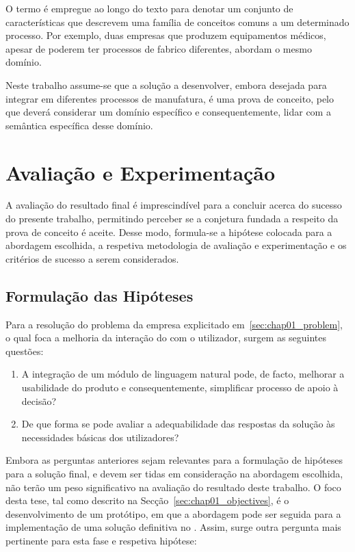 O termo  é empregue ao longo do texto para denotar um conjunto de características que descrevem uma família de conceitos comuns a um determinado processo. Por exemplo, duas empresas que produzem equipamentos médicos, apesar de poderem ter processos de fabrico diferentes, abordam o mesmo domínio.

Neste trabalho assume-se que a solução a desenvolver, embora desejada para integrar em diferentes processos de manufatura, é uma prova de conceito, pelo que deverá considerar um domínio específico e consequentemente, lidar com a semântica específica desse domínio.

\section{Avaliação e Experimentação}
\label{sec:chap01_solutionevaluation}
A avaliação do resultado final é imprescindível para a concluir acerca do sucesso do presente trabalho, permitindo perceber se a conjetura fundada a respeito da prova de conceito é aceite. Desse modo, formula-se a hipótese colocada para a abordagem escolhida, a respetiva metodologia de avaliação e experimentação e os critérios de sucesso a serem considerados.

\subsection{Formulação das Hipóteses}
\label{sec:chap01_hypothesis}
Para a resolução do problema da empresa explicitado em~\ref{sec:chap01_problem}, o qual foca a melhoria da interação do {\productname} com o utilizador, surgem as seguintes questões:

\begin{enumerate}
    \item
    {
        A integração de um módulo de linguagem natural pode, de facto, melhorar a usabilidade do produto e consequentemente, simplificar processo de apoio à decisão?
    }
    \item
    {
        De que forma se pode avaliar a adequabilidade das respostas da solução às necessidades básicas dos utilizadores?
    }
\end{enumerate}

Embora as perguntas anteriores sejam relevantes para a formulação de hipóteses para a solução final, e devem ser tidas em consideração na abordagem escolhida, não terão um peso significativo na avaliação do resultado deste trabalho. O foco desta tese, tal como descrito na Secção~\ref{sec:chap01_objectives}, é o desenvolvimento de um protótipo, em que a abordagem pode ser seguida para a implementação de uma solução definitiva no {\productname}. Assim, surge outra pergunta mais pertinente para esta fase e respetiva hipótese:

